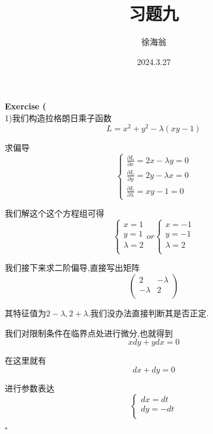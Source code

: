 \documentclass[11pt,hyperref,a4paper,UTF8]{ctexart}
\title{习题九}
\author{徐海翁}
\date{2024.3.27}
\newenvironment{exercise}[1]{%
{\textbf{Exercise #1} \\ 
    }
}{
  \hfill $\square$ 
  \par\bigskip 
}
\begin{document}
\begin{CJK}{UTF8}{gkai}

\maketitle

\begin{exercise}{27}
    (1)我们构造拉格朗日乘子函数
    \[L = x^2 + y^2 - \lambda(xy - 1)\]

    求偏导
    \[\begin{cases}
        \frac{\partial L}{\partial x} = 2x - \lambda y = 0\\
        \frac{\partial L}{\partial y} = 2y - \lambda x = 0\\
        \frac{\partial L}{\partial \lambda} = xy - 1 = 0
    \end{cases}\]

    我们解这个这个方程组可得
    \[\begin{cases}
        x = 1\\
        y = 1\\
        \lambda = 2\\
    \end{cases} or
    \begin{cases}
        x = -1\\
        y = -1\\
        \lambda = 2\\
    \end{cases}\]

    我们接下来求二阶偏导,直接写出矩阵
    \[\begin{pmatrix}
        2&-\lambda\\
        -\lambda&2\\
    \end{pmatrix}\]

    其特征值为$2 - \lambda,2 + \lambda$.我们没办法直接判断其是否正定.

    我们对限制条件在临界点处进行微分,也就得到
    \[x dy + y dx = 0\]

    在这里就有
    \[dx + dy = 0\]

    进行参数表达
    \[\begin{cases}
        dx = dt\\
        dy = -dt\\
    \end{cases}\]


\end{exercise}
\end{CJK}
\end{document}
